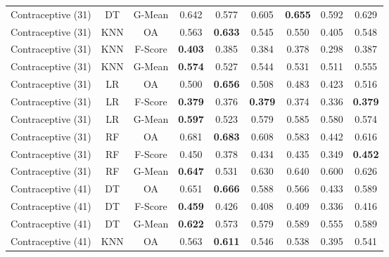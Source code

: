 \begin{longtable}{ccccccccc}
Contraceptive (31) &         DT &  G-Mean &          0.642 &          0.577 &          0.605 & \textbf{0.655} &          0.592 &          0.629 \\
Contraceptive (31) &        KNN &      OA &          0.563 & \textbf{0.633} &          0.545 &          0.550 &          0.405 &          0.548 \\
Contraceptive (31) &        KNN & F-Score & \textbf{0.403} &          0.385 &          0.384 &          0.378 &          0.298 &          0.387 \\
Contraceptive (31) &        KNN &  G-Mean & \textbf{0.574} &          0.527 &          0.544 &          0.531 &          0.511 &          0.555 \\
Contraceptive (31) &         LR &      OA &          0.500 & \textbf{0.656} &          0.508 &          0.483 &          0.423 &          0.516 \\
Contraceptive (31) &         LR & F-Score & \textbf{0.379} &          0.376 & \textbf{0.379} &          0.374 &          0.336 & \textbf{0.379} \\
Contraceptive (31) &         LR &  G-Mean & \textbf{0.597} &          0.523 &          0.579 &          0.585 &          0.580 &          0.574 \\
Contraceptive (31) &         RF &      OA &          0.681 & \textbf{0.683} &          0.608 &          0.583 &          0.442 &          0.616 \\
Contraceptive (31) &         RF & F-Score &          0.450 &          0.378 &          0.434 &          0.435 &          0.349 & \textbf{0.452} \\
Contraceptive (31) &         RF &  G-Mean & \textbf{0.647} &          0.531 &          0.630 &          0.640 &          0.600 &          0.626 \\
Contraceptive (41) &         DT &      OA &          0.651 & \textbf{0.666} &          0.588 &          0.566 &          0.433 &          0.589 \\
Contraceptive (41) &         DT & F-Score & \textbf{0.459} &          0.426 &          0.408 &          0.409 &          0.336 &          0.416 \\
Contraceptive (41) &         DT &  G-Mean & \textbf{0.622} &          0.573 &          0.579 &          0.589 &          0.555 &          0.589 \\
Contraceptive (41) &        KNN &      OA &          0.563 & \textbf{0.611} &          0.546 &          0.538 &          0.395 &          0.541 \\

\end{longtable}
